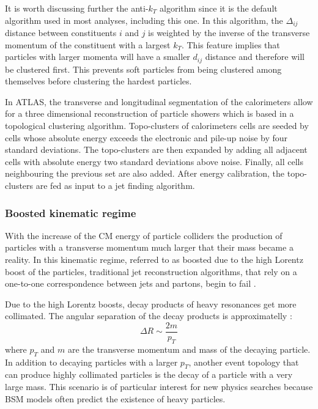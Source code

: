 It is worth discussing further the anti-$k_T$ algorithm since it is the default algorithm used in most analyses, including this one. In this algorithm, the $\Delta_{ij}$ distance between constituents $i$ and $j$ is weighted by the inverse of the transverse momentum of the constituent with a largest $k_T$. This feature implies that particles with larger momenta will have a smaller $d_{ij}$ distance and therefore will be clustered first. This prevents soft particles from being clustered among themselves before clustering the hardest particles.

In ATLAS, the transverse and longitudinal segmentation of the calorimeters allow for a three dimensional reconstruction of particle showers which is based in a topological clustering algorithm. Topo-clusters of calorimeters cells are seeded by cells whose absolute energy exceeds the electronic and pile-up noise by four standard deviations. The topo-clusters are then expanded by adding all adjacent cells with absolute energy two standard deviations above noise. Finally, all cells neighbouring the previous set are also added. After energy calibration, the topo-clusters are fed as input to a jet finding algorithm.  

\subsubsection{Boosted kinematic regime}

With the increase of the CM energy of particle colliders the production of particles with a transverse momentum much larger that their mass became a reality. In this kinematic regime, referred to as boosted due to the high Lorentz boost of the particles, traditional jet reconstruction algorithms, that rely on a one-to-one correspondence between jets and partons, begin to fail \cite{jetsubLHC}. 

Due to the high Lorentz boosts, decay products of heavy resonances get more collimated. The angular separation of the decay products is approximatelly \cite{jetsub}:
\begin{equation}
	\Delta R \sim \frac{2 m}{p_T}
	\label{eq:deltaR}
\end{equation}
where $p_T$ and $m$ are the transverse momentum and mass of the decaying particle. In addition to decaying particles with a larger $p_T$, another event topology that can produce highly collimated particles is the decay of a particle with a very large mass. This scenario is of particular interest for new physics searches because BSM models often predict the existence of heavy particles. 


